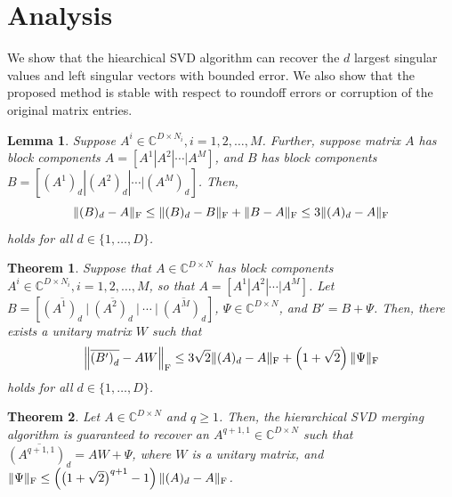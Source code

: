 \documentclass[a0,landscape]{a0poster}
\newtheorem{thm}{Theorem}
\newtheorem{lemma}{Lemma}
\begin{document}
\begin{multicols}{4}
\begin{itemize}[noitemsep]
\end{itemize}



\section*{Analysis}
We show that the hiearchical SVD algorithm can recover the $d$ largest
singular values and left singular vectors with bounded error.  We also
show that the proposed method is stable with respect to roundoff
errors or corruption of the original matrix entries.
\begin{lemma}
  Suppose $A^i \in \mathbb{C}^{D\times N_i}, i=1,2,\ldots,M$.
  Further, suppose matrix $A$ has block components
  $A=\left[A^1|A^2|\cdots|A^M\right]$, and $B$ has block components
  $B=\left[(A^1)_d | (A^2)_d |\cdots|(A^M)_d \right]$.  Then, $$\|
  (B)_d - A \|_{\rm F} \leq \| (B)_d - B \|_{\rm F} +  \| B - A \|_{\rm F} \leq 3 \| (A)_d - A \|_{\rm F}$$ holds for all $d \in \{ 1, \dots, D\}$.
\end{lemma}


\begin{thm}
  Suppose that $A \in \mathbb{C}^{D\times N}$ has block components
  $A^i \in \mathbb{C}^{D\times N_i}, i=1,2,\ldots,M$, so that
  $A=\left[A^1|A^2|\cdots|A^M\right]$.  Let
  $B=\left[\overline{(A^1)_d} ~\big|~ \overline{(A^2)_d} ~\big|~
    \cdots~\big|~ \overline{(A^M)_d} \right]$, $\Psi \in
  \mathbb{C}^{D\times N}$, and $B' = B + \Psi$.  Then, there exists a
  unitary matrix $W$ such that
  $$\left\| \overline{\left( B' \right)_d} - AW \right\|_{\rm F} \leq
  3\sqrt{2} \| (A)_d - A \|_{\rm F} + \left(1+ \sqrt{2} \right) \|
  \Psi \|_{\rm F}$$ holds for all $d \in \{ 1, \dots, D\}$.
\end{thm}

\begin{thm}
  Let $A \in \mathbb{C}^{D\times N}$ and $q \geq 1$.  Then, the
  hierarchical SVD merging algorithm is guaranteed to recover an
  $A^{q+1,1} \in \mathbb{C}^{D\times N}$ such that
  $\overline{\left(A^{q+1,1} \right)_d} = A W + \Psi$, where $W$ is a
  unitary matrix, and $\| \Psi \|_{\rm F} \leq \left( \left( 1 +
  \sqrt{2} \right)^{q+1} - 1 \right) \| (A)_d - A \|_{\rm F}$.
\end{thm}


\end{multicols}
\end{document}
